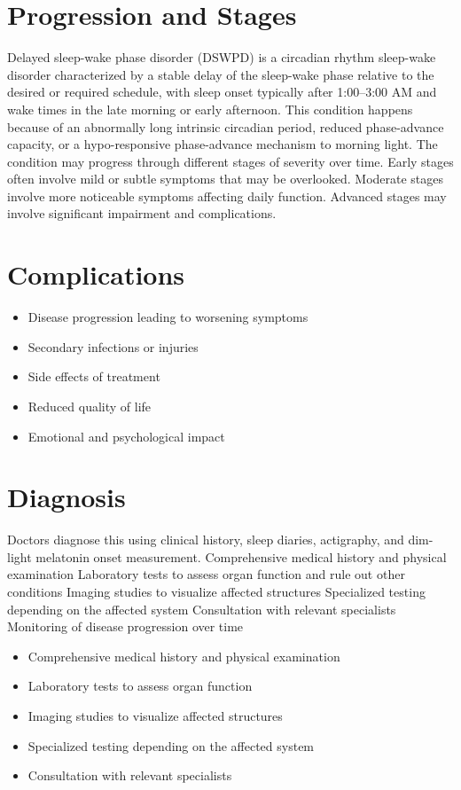 \section{Progression and Stages}
Delayed sleep-wake phase disorder (DSWPD) is a circadian rhythm sleep-wake disorder characterized by a stable delay of the sleep-wake phase relative to the desired or required schedule, with sleep onset typically after 1:00--3:00 AM and wake times in the late morning or early afternoon. This condition happens because of an abnormally long intrinsic circadian period, reduced phase-advance capacity, or a hypo-responsive phase-advance mechanism to morning light. The condition may progress through different stages of severity over time. Early stages often involve mild or subtle symptoms that may be overlooked. Moderate stages involve more noticeable symptoms affecting daily function. Advanced stages may involve significant impairment and complications.
\section{Complications}
\begin{itemize}[noitemsep]
  \item Disease progression leading to worsening symptoms
  \item Secondary infections or injuries
  \item Side effects of treatment
  \item Reduced quality of life
  \item Emotional and psychological impact
\end{itemize}
\section{Diagnosis}
Doctors diagnose this using clinical history, sleep diaries, actigraphy, and dim-light melatonin onset measurement. Comprehensive medical history and physical examination Laboratory tests to assess organ function and rule out other conditions Imaging studies to visualize affected structures Specialized testing depending on the affected system Consultation with relevant specialists Monitoring of disease progression over time

\begin{itemize}[noitemsep]
  \item Comprehensive medical history and physical examination
  \item Laboratory tests to assess organ function
  \item Imaging studies to visualize affected structures
  \item Specialized testing depending on the affected system
  \item Consultation with relevant specialists
\end{itemize}
